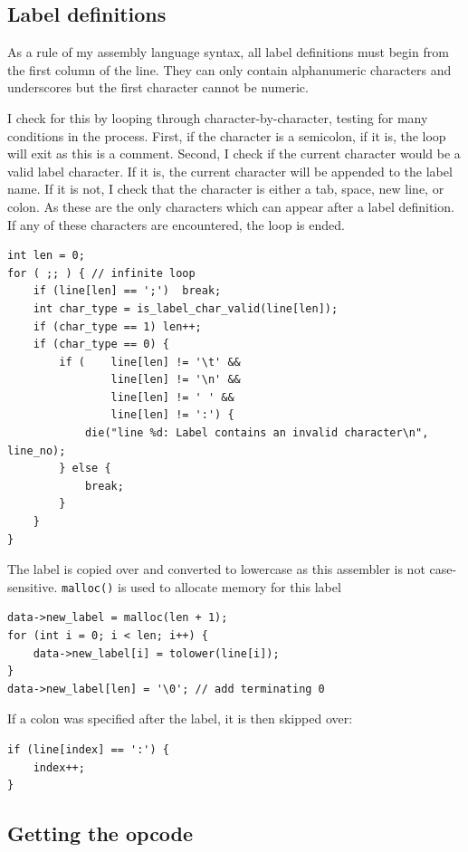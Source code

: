 \documentclass[a4paper]{report}
\begin{document}
\subsection{Label definitions}

As a rule of my assembly language syntax, all label definitions must begin from
the first column of the line. They can only contain alphanumeric characters and
underscores but the first character cannot be numeric.

I check for this by looping through character-by-character, testing for many
conditions in the process. First, if the character is a semicolon, if it is,
the loop will exit as this is a comment. Second, I check if the current
character would be a valid label character. If it is, the current character will
be appended to the label name. If it is not, I check that the character is
either a tab, space, new line, or colon. As these are the only characters which
can appear after a label definition. If any of these characters are encountered,
the loop is ended.

\begin{lstlisting}
int len = 0;
for ( ;; ) { // infinite loop
	if (line[len] == ';')  break;
	int char_type = is_label_char_valid(line[len]);
	if (char_type == 1) len++;
	if (char_type == 0) {
		if (	line[len] != '\t' &&
				line[len] != '\n' &&
				line[len] != ' ' &&
				line[len] != ':') {
			die("line %d: Label contains an invalid character\n", line_no);
		} else {
			break;
		}
	}
}
\end{lstlisting}

The label is copied over and converted to lowercase as this assembler is not
case-sensitive. \texttt{malloc()} is used to allocate memory for this label

\begin{lstlisting}
data->new_label = malloc(len + 1);
for (int i = 0; i < len; i++) {
	data->new_label[i] = tolower(line[i]);
}
data->new_label[len] = '\0'; // add terminating 0
\end{lstlisting}

If a colon was specified after the label, it is then skipped over:

\begin{lstlisting}
if (line[index] == ':') {
	index++;
}
\end{lstlisting}

\subsection{Getting the opcode}
\end{document}
